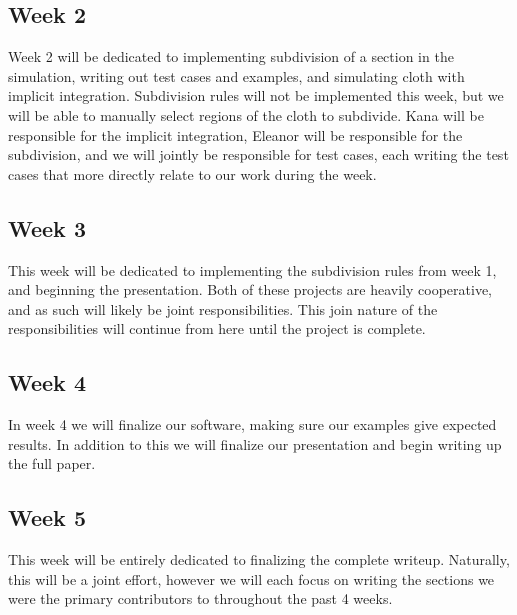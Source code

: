 \documentclass{article}
\begin{document}
\begin{multicols}{2}
\subsection*{Week 2}
Week 2 will be dedicated to implementing subdivision of a section in the simulation, writing out test cases and examples, and simulating cloth with implicit integration. Subdivision rules will not be implemented this week, but we will be able to manually select regions of the cloth to subdivide. Kana will be responsible for the implicit integration, Eleanor will be responsible for the subdivision, and we will jointly be responsible for test cases, each writing the test cases that more directly relate to our work during the week.
\subsection*{Week 3}
This week will be dedicated to implementing the subdivision rules from week 1, and beginning the presentation. Both of these projects are heavily cooperative, and as such will likely be joint responsibilities. This join nature of the responsibilities will continue from here until the project is complete.
\subsection*{Week 4}
In week 4 we will finalize our software, making sure our examples give expected results. In addition to this we will finalize our presentation and begin writing up the full paper.
\subsection*{Week 5}
This week will be entirely dedicated to finalizing the complete writeup. Naturally, this will be a joint effort, however we will each focus on writing the sections we were the primary contributors to throughout the past 4 weeks.
\end{multicols}
\newpage
\printbibliography[title={References}]
\end{document}
